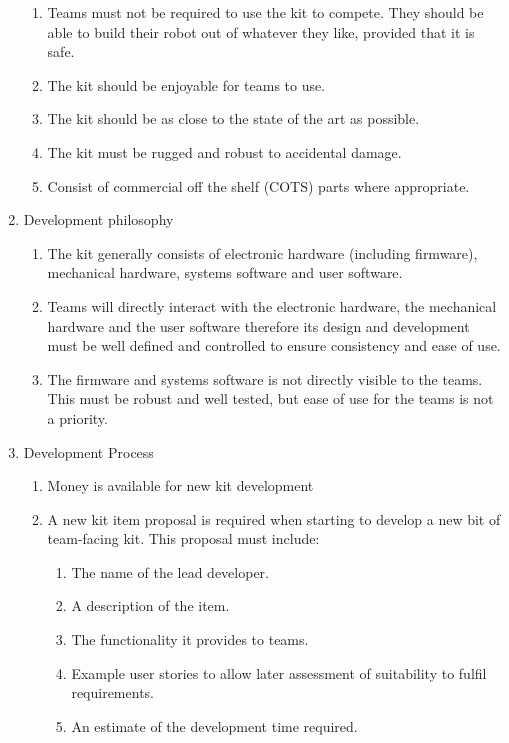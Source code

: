 \begin{enumerate}
\begin{enumerate}
    \item Teams must not be required to use the kit to compete.  They should be able to build their robot out of whatever they like, provided that it is safe.

    \item The kit should be enjoyable for teams to use.

    \item The kit should be as close to the state of the art as possible.

    \item The kit must be rugged and robust to accidental damage.
    \item{Consist of commercial off the shelf (COTS) parts where appropriate.}
  \end{enumerate}
\item Development philosophy
  \begin{enumerate}
    \item The kit generally consists of electronic hardware (including firmware), mechanical hardware, systems software and user software.
    \item Teams will directly interact with the electronic hardware, the mechanical hardware and the user software therefore its design and development must be well defined and controlled to ensure consistency and ease of use.
    \item The firmware and systems software is not directly visible to the teams. This must be robust and well tested, but ease of use for the teams is not a priority.
  \end{enumerate}
\item Development Process
  \begin{enumerate}
    \item Money is available for new kit development
    \item A new kit item proposal is required when starting to develop a new bit of team-facing kit. This proposal must include:
      \begin{enumerate}
        \item The name of the lead developer.
        \item A description of the item.
        \item The functionality it provides to teams.
        \item Example user stories to allow later assessment of suitability to fulfil requirements.
        \item An estimate of the development time required.

\end{enumerate}
\end{enumerate}
\end{enumerate}
